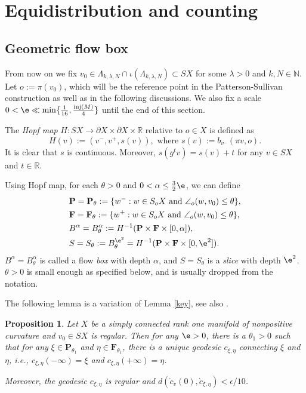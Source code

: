 \documentclass[11pt]{amsart}
\newtheorem{proposition}[theorem]{Proposition}
\theoremstyle{definition}
\def\pX{{\partial X}}
\def\RR{{\mathbb R}}
\def\NN{{\mathbb N}}
\def\inj{{\text{inj}}}
\def\a{\alpha}
\def\l{\lambda}   \def\L{\Lambda}
\def\bP{\textbf{P}}
\def\bF{\textbf{F}}
\begin{document}
\section{Equidistribution and counting}
\subsection{Geometric flow box}

From now on we fix $v_0\in \L_{k,\l,N}\cap \iota(\L_{k,\l,N})\subset SX$ for some $\l>0$ and $k,N\in \NN$. Let $o:=\pi(v_0)$, which will be the reference point in the Patterson-Sullivan construction as well as in the following discussions. We also fix a scale $0<\e\ll \min\{\frac{1}{16}, \frac{\inj (M)}{4}\}$ until the end of this section.

The \emph{Hopf map} $H: SX\to \pX\times \pX\times \RR$ relative to $o\in X$ is defined as
$$H(v):=(v^-, v^+, s(v)), \text{\ where\ }s(v):=b_{v^-}(\pi v, o).$$
It is clear that $s$ is continuous. Moreover, $s(g^t v)=s(v)+t$ for any $v\in SX$ and $t\in \RR$. 

Using Hopf map, for each $\theta>0$ and $0<\a\le \frac{3}{2}\e$, we can define
\begin{equation*}
\begin{aligned}
&\bP=\bP_\theta:=\{w^-: w\in S_oX \text{\ and\ }\angle_o(w, v_0)\le \theta\},\\
&\bF=\bF_\theta:=\{w^+: w\in S_oX \text{\ and\ }\angle_o(w, v_0)\le \theta\},\\
&B^\a=B_\theta^\a:=H^{-1}(\bP\times \bF\times [0,\a]),\\
&S=S_\theta:=B_\theta^{\e^2}=H^{-1}(\bP\times \bF\times [0,\e^2]).
\end{aligned}
\end{equation*}
$B^\a=B_\theta^\a$ is called a flow \emph{box} with depth $\a$, and $S=S_\theta$ is a \emph{slice} with depth $\e^2$. $\theta>0$ is small enough as specified below, and is usually dropped from the notation.

The following lemma is a variation of Lemma \ref{key}, see also \cite[Lemma 1]{Ri}.
\begin{proposition}\label{crucial} 
Let $X$ be a simply connected rank one manifold of nonpositive curvature and $v_0\in SX$ is regular. Then for any $\e>0$, there is a $\theta_1 > 0$ such that for any $\xi \in \bP_{\theta_1}$ and $\eta \in \bF_{\theta_1}$,
there is a unique geodesic $c_{\xi,\eta}$ connecting $\xi$ and $\eta$, i.e.,
$c_{\xi,\eta}(-\infty)=\xi$ and $c_{\xi,\eta}(+\infty)=\eta$.

Moreover, the geodesic $c_{\xi,\eta}$ is regular and $d(\dot c_{v}(0),\dot c_{\xi,\eta})<\epsilon/10$.
\end{proposition}
\end{document}
